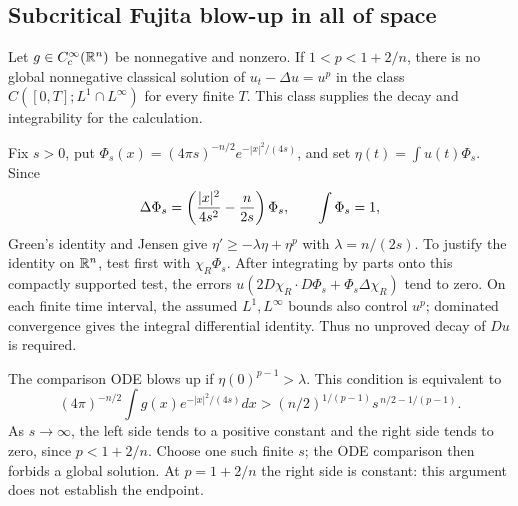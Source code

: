 \subsection{Subcritical Fujita blow-up in all of space}
\Needspace{50mm}
\begin{theorem}
Let $g\in C_c^\infty(\mathbb{R}^n)$ be nonnegative and nonzero. If
$1<p<1+2/n$, there is no global nonnegative classical solution of
$u_t-\Delta u=u^p$ in the class $C([0,T];L^1\cap L^\infty)$ for every
finite $T$. This class supplies the decay and integrability for the calculation.
\end{theorem}
\begin{expandedproof}
Fix $s>0$, put $\Phi_s(x)=(4\pi s)^{-n/2}e^{-|x|^2/(4s)}$, and set
$\eta(t)=\int u(t)\Phi_s$. Since
\[
 \Delta\Phi_s=\left({|x|^2\over4s^2}-{n\over2s}\right)\Phi_s,
 \qquad \int\Phi_s=1,
\]
Green's identity and Jensen give
$\eta'\geq-\lambda\eta+\eta^p$ with $\lambda=n/(2s)$.
To justify the identity on $\mathbb{R}^n$, test first with $\chi_R\Phi_s$.
After integrating by parts onto this compactly supported test, the errors
$u(2D\chi_R\cdot D\Phi_s+\Phi_s\Delta\chi_R)$ tend to zero.
On each finite time interval, the assumed $L^1,L^\infty$ bounds also
control $u^p$; dominated convergence gives the integral differential
identity. Thus no unproved decay of $Du$ is required.

The comparison ODE blows up if $\eta(0)^{p-1}>\lambda$.
This condition is equivalent to
\[
 (4\pi)^{-n/2}\int g(x)e^{-|x|^2/(4s)}dx
 > (n/2)^{1/(p-1)}s^{\,n/2-1/(p-1)}.
\]
As $s\to\infty$, the left side tends to a positive constant and the right
side tends to zero, since $p<1+2/n$. Choose one such finite $s$; the
ODE comparison then forbids a global solution. At $p=1+2/n$ the right
side is constant: this argument does not establish the endpoint.
\end{expandedproof}
\Needspace{42mm}

\Needspace{40mm}
